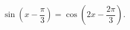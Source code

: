 \begin{ex}[type=equation]
	\begin{condition}
		$\ \sin {\left(x -\dfrac{\pi }{3}\right)} =\cos {\left(2x -\dfrac{2\pi }{3}\right)}. $
	\end{condition}
\end{ex}